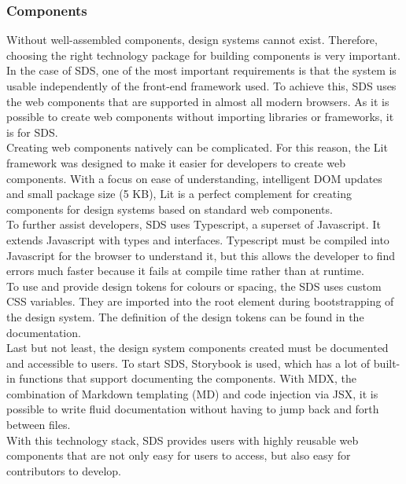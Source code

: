\subsubsection{Components} \label{sds-component}
Without well-assembled components, design systems cannot exist. Therefore, choosing the right technology package for building components is very important. 
In the case of \ac{SDS}, one of the most important requirements is that the system is usable independently of the front-end framework used. To achieve this, \ac{SDS} uses the web components that are supported in almost all modern browsers. As it is possible to create web components without importing libraries or frameworks, it is for \ac{SDS}. \citep{mdn_web_component_nodate} \\
Creating web components natively can be complicated. For this reason, the Lit framework was designed to make it easier for developers to create web components. With a focus on ease of understanding, intelligent DOM updates and small package size (5 KB), Lit is a perfect complement for creating components for design systems based on standard web components. \citep{lit_nodate} \\
To further assist developers, \ac{SDS} uses Typescript, a superset of Javascript. It extends Javascript with types and interfaces. Typescript must be compiled into Javascript for the browser to understand it, but this allows the developer to find errors much faster because it fails at compile time rather than at runtime. \citep{microsoft_typescript_nodate} \\
To use and provide design tokens for colours or spacing, the \ac{SDS} uses custom CSS variables. They are imported into the root element during bootstrapping of the design system. The definition of the design tokens can be found in the documentation. \citep{mdn_css_vars_nodate} \\
Last but not least, the design system components created must be documented and accessible to users. To start \ac{SDS}, Storybook is used, which has a lot of built-in functions that support documenting the components. With MDX, the combination of Markdown templating (MD) and code injection via JSX, it is possible to write fluid documentation without having to jump back and forth between files. \citep{otander_markdown_2017} \\
With this technology stack, \ac{SDS} provides users with highly reusable web components that are not only easy for users to access, but also easy for contributors to develop. 
